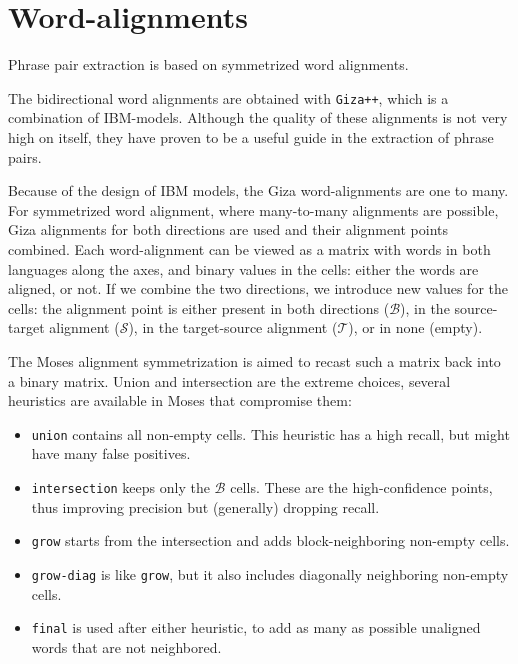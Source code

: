 \documentclass[11pt]{article}
\begin{document}
\section{Word-alignments}
Phrase pair extraction is based on symmetrized word alignments. 

The bidirectional word alignments are obtained with {\tt Giza++}, which is a combination of IBM-models. Although the quality of these alignments is not very high on itself, they have proven to be a useful guide in the extraction of phrase pairs. 


 Because of the design of IBM models, the Giza word-alignments are one to many. For symmetrized word alignment, where many-to-many alignments are possible, Giza alignments for both directions are used and their alignment points combined. Each word-alignment can be viewed as a matrix with words in both languages along the axes, and binary values in the cells: either the words are aligned, or not. If we combine the two directions, we introduce new values for the cells: the alignment point is either present in both directions ($\mathcal B$), in the source-target alignment ($\mathcal S$), in the target-source alignment ($\mathcal T$), or in none (empty).

The Moses alignment symmetrization is aimed to recast such a matrix back into a binary matrix. Union and intersection are the extreme choices, several  heuristics are available in Moses that compromise them:\begin{itemize}
\item {\tt union} contains all non-empty cells. This heuristic has a high recall, but might have many false positives.
\item  {\tt intersection} keeps only the $\mathcal B$ cells. These are the high-confidence points, thus improving precision but (generally) dropping recall.
\item {\tt grow} starts from the intersection and adds block-neighboring non-empty cells.
\item {\tt grow-diag} is like {\tt grow}, but it also includes diagonally neighboring non-empty cells.
\item {\tt final} is used after either heuristic, to add as many as possible unaligned words that are not neighbored.  %
\end{itemize}
\end{document}
